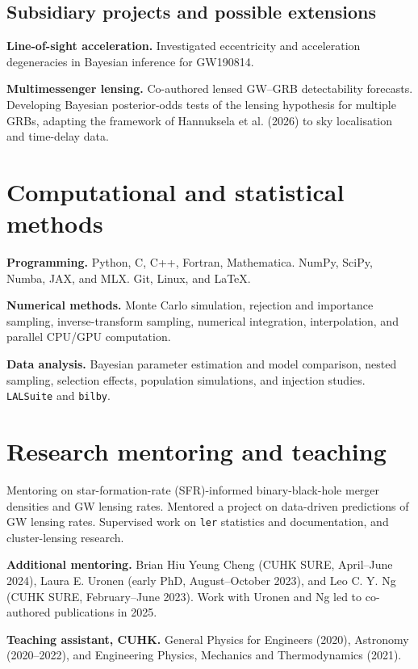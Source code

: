\documentclass[11pt]{article}
\begin{document}
\subsection*{Subsidiary projects and possible extensions}
\textbf{Line-of-sight acceleration.} Investigated eccentricity and acceleration degeneracies in Bayesian inference for GW190814.

\textbf{Multimessenger lensing.} Co-authored lensed GW--GRB detectability forecasts. Developing Bayesian posterior-odds tests of the lensing hypothesis for multiple GRBs, adapting the framework of Hannuksela et al. (2026) to sky localisation and time-delay data.

\section*{Computational and statistical methods}
\textbf{Programming.} Python, C, C++, Fortran, Mathematica. NumPy, SciPy, Numba, JAX, and MLX. Git, Linux, and \LaTeX.

\textbf{Numerical methods.} Monte Carlo simulation, rejection and importance sampling, inverse-transform sampling, numerical integration, interpolation, and parallel CPU/GPU computation.

\textbf{Data analysis.} Bayesian parameter estimation and model comparison, nested sampling, selection effects, population simulations, and injection studies. \texttt{LALSuite} and \texttt{bilby}.

\section*{Research mentoring and teaching}
Mentoring on star-formation-rate (SFR)-informed binary-black-hole merger densities and GW lensing rates.
Mentored a project on data-driven predictions of GW lensing rates.
Supervised work on \texttt{ler} statistics and documentation, and cluster-lensing research.

\textbf{Additional mentoring.} Brian Hiu Yeung Cheng (CUHK SURE, April--June 2024), Laura E. Uronen (early PhD, August--October 2023), and Leo C. Y. Ng (CUHK SURE, February--June 2023). Work with Uronen and Ng led to co-authored publications in 2025.

\textbf{Teaching assistant, CUHK.} General Physics for Engineers (2020), Astronomy (2020--2022), and Engineering Physics, Mechanics and Thermodynamics (2021).
\end{document}
